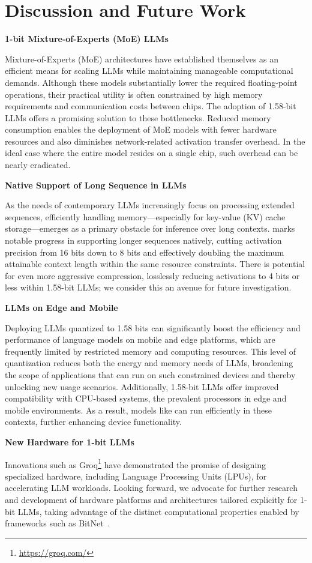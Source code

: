 \section{Discussion and Future Work}

\textbf{1-bit Mixture-of-Experts (MoE) LLMs}

Mixture-of-Experts (MoE) architectures have established themselves as an efficient means for scaling LLMs while maintaining manageable computational demands. Although these models substantially lower the required floating-point operations, their practical utility is often constrained by high memory requirements and communication costs between chips. The adoption of 1.58-bit LLMs offers a promising solution to these bottlenecks. Reduced memory consumption enables the deployment of MoE models with fewer hardware resources and also diminishes network-related activation transfer overhead. In the ideal case where the entire model resides on a single chip, such overhead can be nearly eradicated.

\textbf{Native Support of Long Sequence in LLMs}

As the needs of contemporary LLMs increasingly focus on processing extended sequences, efficiently handling memory—especially for key-value (KV) cache storage—emerges as a primary obstacle for inference over long contexts.  marks notable progress in supporting longer sequences natively, cutting activation precision from 16 bits down to 8 bits and effectively doubling the maximum attainable context length within the same resource constraints. There is potential for even more aggressive compression, losslessly reducing activations to 4 bits or less within 1.58-bit LLMs; we consider this an avenue for future investigation.

\textbf{LLMs on Edge and Mobile}

Deploying LLMs quantized to 1.58 bits can significantly boost the efficiency and performance of language models on mobile and edge platforms, which are frequently limited by restricted memory and computing resources. This level of quantization reduces both the energy and memory needs of LLMs, broadening the scope of applications that can run on such constrained devices and thereby unlocking new usage scenarios. Additionally, 1.58-bit LLMs offer improved compatibility with CPU-based systems, the prevalent processors in edge and mobile environments. As a result, models like  can run efficiently in these contexts, further enhancing device functionality.

\textbf{New Hardware for 1-bit LLMs}

Innovations such as Groq\footnote{\url{https://groq.com/}} have demonstrated the promise of designing specialized hardware, including Language Processing Units (LPUs), for accelerating LLM workloads. Looking forward, we advocate for further research and development of hardware platforms and architectures tailored explicitly for 1-bit LLMs, taking advantage of the distinct computational properties enabled by frameworks such as BitNet~\cite{bitnet}.